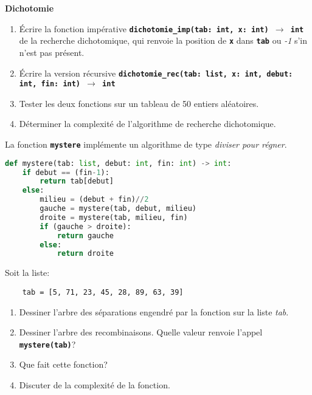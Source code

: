 \documentclass[a4paper,11pt]{article}
\begin{document}
\begin{exo}\textbf{Dichotomie}
    \begin{enumerate}
        \item Écrire la fonction impérative \textbf{\texttt{dichotomie\_imp(tab: int, x: int) $\rightarrow$ int}} de la recherche dichotomique, qui renvoie la position de \textbf{\texttt{x}} dans \textbf{\texttt{tab}} ou \emph{-1} s'in n'est pas présent.
        \item Écrire la version récursive \textbf{\texttt{dichotomie\_rec(tab: list, x: int, debut: int, fin: int) $\rightarrow$ int}}
        \item Tester les deux fonctions sur un tableau de 50 entiers aléatoires.
        \item Déterminer la complexité de l'algorithme de recherche dichotomique.
    \end{enumerate}
\end{exo}
\begin{exo}
    La fonction \textbf{\texttt{mystere}} implémente un algorithme de type \emph{diviser pour régner}.
\begin{center}
\begin{lstlisting}[language=Python  , xleftmargin=2em, xrightmargin=2em]
def mystere(tab: list, debut: int, fin: int) -> int:
    if debut == (fin-1):
        return tab[debut]
    else:
        milieu = (debut + fin)//2
        gauche = mystere(tab, debut, milieu)
        droite = mystere(tab, milieu, fin)
        if (gauche > droite):
            return gauche
        else:
            return droite
\end{lstlisting}
\end{center}
    Soit la liste:
    \begin{lstlisting}
    tab = [5, 71, 23, 45, 28, 89, 63, 39]
\end{lstlisting}
    \begin{enumerate}
    \item Dessiner l'arbre des séparations engendré par la fonction sur la liste \emph{tab}.
    \item Dessiner l'arbre des recombinaisons. Quelle valeur renvoie l'appel \texttt{\textbf{mystere(tab)}}?
    \item Que fait cette fonction?
    \item Discuter de la complexité de la fonction.
    \end{enumerate}
    \end{exo}
\end{document}
